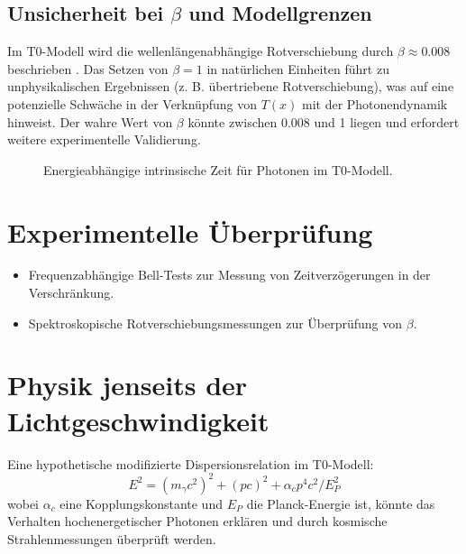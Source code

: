 \documentclass[12pt,a4paper]{article}
\newcommand{\Tfield}{T(x)}
\begin{document}
	\subsection{Unsicherheit bei \(\beta\) und Modellgrenzen}
	Im T0-Modell wird die wellenlängenabhängige Rotverschiebung durch \(\beta \approx 0.008\) beschrieben \cite{pascher_params_2025}. Das Setzen von \(\beta = 1\) in natürlichen Einheiten \cite{pascher_temp_2025} führt zu unphysikalischen Ergebnissen (z. B. übertriebene Rotverschiebung), was auf eine potenzielle Schwäche in der Verknüpfung von \(\Tfield\) mit der Photonendynamik hinweist. Der wahre Wert von \(\beta\) könnte zwischen 0.008 und 1 liegen und erfordert weitere experimentelle Validierung.
	
	\begin{figure}[h]
		\centering
		\caption{Energieabhängige intrinsische Zeit für Photonen im T0-Modell.}
	\end{figure}
	
	\section{Experimentelle Überprüfung}
	\begin{itemize}
		\item Frequenzabhängige Bell-Tests zur Messung von Zeitverzögerungen in der Verschränkung.
		\item Spektroskopische Rotverschiebungsmessungen zur Überprüfung von \(\beta\).
	\end{itemize}
	
	\section{Physik jenseits der Lichtgeschwindigkeit}
	Eine hypothetische modifizierte Dispersionsrelation im T0-Modell:
	\begin{equation}
		E^2 = (m_\gamma c^2)^2 + (pc)^2 + \alpha_c p^4 c^2 / E_P^2
	\end{equation}
	wobei \(\alpha_c\) eine Kopplungskonstante und \(E_P\) die Planck-Energie ist, könnte das Verhalten hochenergetischer Photonen erklären und durch kosmische Strahlenmessungen überprüft werden.
	
\end{document}
